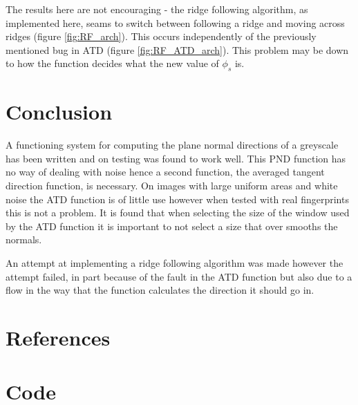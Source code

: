 \documentclass[11pt,a4paper]{article}
\begin{document}
\begin{multicols}{2}
		The results here are not encouraging - the ridge following algorithm, as implemented here, seams to switch between following a ridge and moving across ridges (figure \ref{fig:RF_arch}). This occurs independently of the previously mentioned bug in ATD (figure \ref{fig:RF_ATD_arch}). This problem may be down to how the function decides what the new value of $\phi_s$ is.

\section{Conclusion}
	A functioning system for computing the plane normal directions of a greyscale has been written and on testing was found to work well. This PND function has no way of dealing with noise hence a second function, the averaged tangent direction function, is necessary. On images with large uniform areas and white noise the ATD function is of little use however when tested with real fingerprints this is not a problem. It is found that when selecting the size of the window used by the ATD function it is important to not select a size that over smooths the normals.

	An attempt at implementing a ridge following algorithm was made however the attempt failed, in part because of the fault in the ATD function but also due to a flow in the way that the function calculates the direction it should go in.

\section{References}
\printbibliography[heading=none]
\end{multicols}

\appendix
\section{Code}
	
\end{document}
